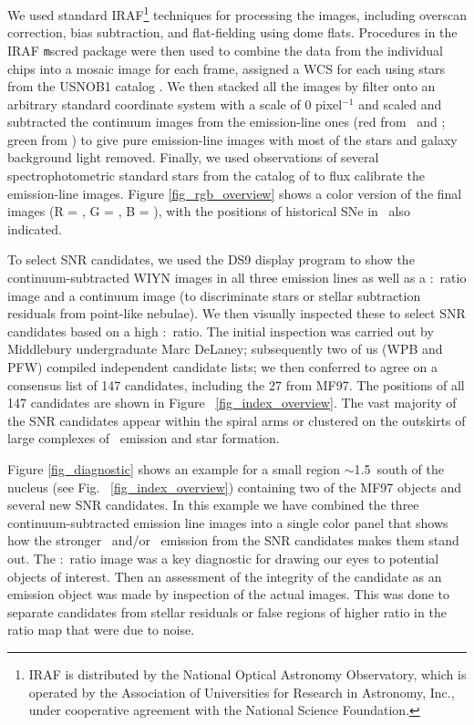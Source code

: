 We used standard IRAF\footnote{IRAF is distributed by the National Optical Astronomy Observatory, which is operated by the Association of Universities for Research in Astronomy, Inc., under cooperative agreement with the National Science Foundation.} techniques for processing the images, including overscan correction, bias subtraction, and flat-fielding using dome flats.  Procedures in the IRAF {\texttt mscred} package were then used to combine the data from the individual chips into a mosaic image for each frame, assigned a WCS for each using stars from the USNOB1 catalog \citep{monet03}.  We then stacked  all the images by filter onto an arbitrary standard coordinate system with a scale of 0 pixel$^{-1}$ and scaled and subtracted the continuum images from the emission-line ones (red from \ha\ and \sii; green from \oiii) to give pure emission-line images with most of the stars and galaxy background light removed.  Finally, we used observations of several spectrophotometric standard stars from the catalog of \citet{massey88} to flux calibrate the emission-line images.  Figure \ref{fig_rgb_overview} shows a color version of the final images (R = \ha, G = \sii, B = \oiii), with the positions of historical SNe in \gal\ also indicated. 



To select SNR candidates, we used the DS9 display program to show the continuum-subtracted WIYN images in all three emission lines as well as a \sii:\ha\ ratio image and a continuum image (to discriminate stars or stellar subtraction residuals from point-like nebulae).   We then visually inspected these to select SNR candidates based on a high \sii:\ha\ ratio.  The initial inspection was carried out by Middlebury undergraduate Marc DeLaney; subsequently two of us (WPB and PFW) compiled independent candidate lists; we then conferred to agree on a consensus list of 147 candidates, including the 27 from MF97. The positions of all 147 candidates are shown in Figure ~\ref{fig_index_overview}. The vast majority of the SNR candidates appear within the spiral arms or clustered on the outskirts of large complexes of \hii\ emission and star formation.

Figure \ref{fig_diagnostic} shows an example for a small region $\sim$1.5\arcmin\ south of the nucleus (see Fig. ~\ref{fig_index_overview}) containing two of the MF97 objects and several new SNR candidates. In this example we have combined the three continuum-subtracted emission line images into a single color panel that shows how the stronger \sii\ and/or \oiii\ emission from the SNR candidates makes them stand out.  The \sii:\ha\ ratio image was a key diagnostic for drawing our eyes to potential objects of interest. Then an assessment of the integrity of the candidate as an emission object was made by inspection of the actual images.  This was done to separate candidates from stellar residuals or false regions of higher ratio in the ratio map that were due to noise.

